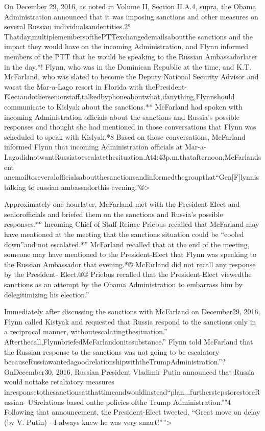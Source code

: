 On December 29, 2016, as noted in Volume II, Section II.A.4, supra, the Obama Administration announced that it was imposing sanctions and other measures on several Russian individualsandentities.2°
Thatday,multiplemembersofthePTTexchangedemailsaboutthe sanctions and the impact they would have on the incoming Administration, and Flynn informed members of the PTT that he would be speaking to the Russian Ambassadorlater in the day.*!
Flynn, who was in the Dominican Republic at the time, and K.T. McFarland, who was slated to become the Deputy National Security Advisor and wasat the Mar-a-Lago resort in Florida with thePresident-Electandotherseniorstaff,talkedbyphoneaboutwhat,ifanything,Flynnshould communicate to Kislyak about the sanctions.**
McFarland had spoken with incoming Administration officials about the sanctions and Russia’s possible responses and thought she had mentioned in those conversations that Flynn was scheduled to speak with Kislyak.*8
Based on those conversations, McFarland informed Flynn that incoming Administration officials at Mar-a- LagodidnotwantRussiatoescalatethesituation.At4:43p.m.thatafternoon,McFarlandsent anemailtoseveralofficialsaboutthesanctionsandinformedthegroupthat“Gen[F]lynnistalking to russian ambassadorthis evening.”®>

Approximately one hourlater, McFarland met with the President-Elect and seniorofficials and briefed them on the sanctions and Russia’s possible responses.*°
Incoming Chief of Staff Reince Priebus recalled that McFarland may have mentioned at the meeting that the sanctions situation could be “cooled down”and not escalated.*”
McFarland recalled that at the end of the meeting, someone may have mentioned to the President-Elect that Flynn was speaking to the Russian Ambassador that evening.*® McFarland did not recall any response by the President- Elect.®®
Priebus recalled that the President-Elect viewedthe sanctions as an attempt by the Obama Administration to embarrass him by delegitimizing his election.”

Immediately after discussing the sanctions with McFarland on December29, 2016, Flynn called Kistyak and requested that Russia respond to the sanctions only in a reciprocal manner, withoutescalatingthesituation.”
Afterthecall,FlynnbriefedMcFarlandonitssubstance.”
Flynn told McFarland that the Russian response to the sanctions was not going to be escalatory becauseRussiawantedagoodrelationshipwiththeTrumpAdministration.”?
OnDecember30, 2016, Russian President Vladimir Putin announced that Russia would nottake retaliatory measures inresponsetothesanctionsatthattimeandwouldinstead“plan...furtherstepstorestoreRussian- USrelations based onthe policies ofthe Trump Administration.”"4
Following that announcement, the President-Elect tweeted, “Great move on delay (by V. Putin) - I always knew he was very smart!””>

